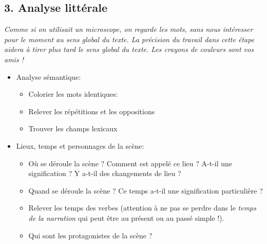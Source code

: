 \subsection*{3. Analyse littérale}
\textit{Comme si on utilisait un microscope, on regarde les mots, sans nous intéresser pour le moment au sens global du texte. La précision du travail dans cette étape aidera à tirer plus tard le sens global du texte. Les crayons de couleurs sont vos amis !}
\begin{itemize}[label=]
\item Analyse sémantique:
\begin{itemize}[label=]
\item Colorier les mots identiques:
\item Relever les répétitions et les oppositions
\item Trouver les champs lexicaux
\end{itemize}
\item Lieux, temps et personnages de la scène:
\begin{itemize}[label=]
\item Où se déroule la scène ? Comment est appelé ce lieu ? A-t-il une signification ? Y a-t-il des changements de lieu ?
\item Quand se déroule la scène ? Ce temps a-t-il une signification particulière ?
\item Relever les temps des verbes (attention à ne pas se perdre dans le \textit{temps de la narration} qui peut être au présent ou au passé simple !).
\item Qui sont les protagonistes de la scène ? 
\end{itemize}
\end{itemize}
